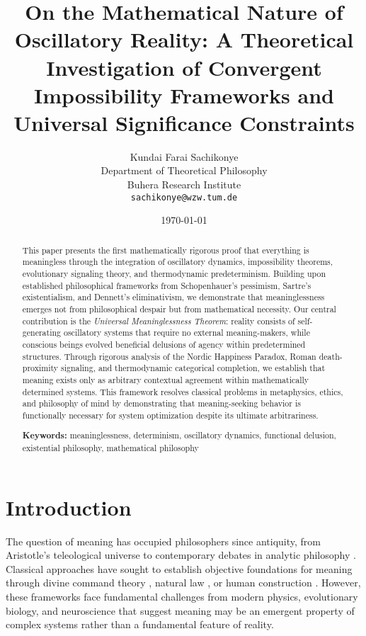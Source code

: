 \documentclass[12pt,a4paper]{article}
\title{On the Mathematical Nature of Oscillatory Reality: A Theoretical Investigation of Convergent Impossibility Frameworks and Universal Significance Constraints}
\author{Kundai Farai Sachikonye\\
Department of Theoretical Philosophy\\
Buhera Research Institute\\
\texttt{sachikonye@wzw.tum.de}}
\date{\today}
\begin{document}
\maketitle

\begin{abstract}
This paper presents the first mathematically rigorous proof that everything is meaningless through the integration of oscillatory dynamics, impossibility theorems, evolutionary signaling theory, and thermodynamic predeterminism. Building upon established philosophical frameworks from Schopenhauer's pessimism, Sartre's existentialism, and Dennett's eliminativism, we demonstrate that meaninglessness emerges not from philosophical despair but from mathematical necessity. Our central contribution is the \textit{Universal Meaninglessness Theorem}: reality consists of self-generating oscillatory systems that require no external meaning-makers, while conscious beings evolved beneficial delusions of agency within predetermined structures. Through rigorous analysis of the Nordic Happiness Paradox, Roman death-proximity signaling, and thermodynamic categorical completion, we establish that meaning exists only as arbitrary contextual agreement within mathematically determined systems. This framework resolves classical problems in metaphysics, ethics, and philosophy of mind by demonstrating that meaning-seeking behavior is functionally necessary for system optimization despite its ultimate arbitrariness.

\textbf{Keywords:} meaninglessness, determinism, oscillatory dynamics, functional delusion, existential philosophy, mathematical philosophy
\end{abstract}

\section{Introduction}

The question of meaning has occupied philosophers since antiquity, from Aristotle's teleological universe \citep{aristotle1999metaphysics} to contemporary debates in analytic philosophy \citep{metz2013meaning}. Classical approaches have sought to establish objective foundations for meaning through divine command theory \citep{adams1999finite}, natural law \citep{murphy2011philosophy}, or human construction \citep{sartre2007existentialism}. However, these frameworks face fundamental challenges from modern physics, evolutionary biology, and neuroscience that suggest meaning may be an emergent property of complex systems rather than a fundamental feature of reality.
\end{document}
